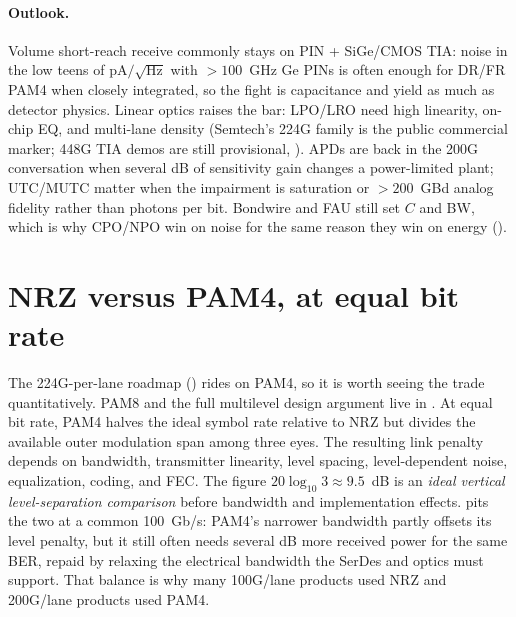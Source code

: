 \paragraph{Outlook.}
Volume short-reach receive commonly stays on PIN + SiGe/CMOS TIA: noise in the
low teens of pA$/\sqrt{\mathrm{Hz}}$ with $>\!100$~GHz Ge PINs is often enough
for DR/FR PAM4 when closely integrated, so the fight is capacitance and yield as
much as detector physics.
Linear optics raises the bar: LPO/LRO need high linearity, on-chip EQ, and
multi-lane density (Semtech's 224G family is the public commercial marker; 448G
TIA demos are still provisional, ). APDs are back in the 200G
conversation when several dB of sensitivity gain changes a power-limited plant;
UTC/MUTC matter when the impairment is saturation or $>\!200$~GBd analog fidelity
rather than photons per bit. Bondwire and FAU still set $C$ and BW, which is why
CPO/NPO win on noise for the same reason they win on energy
().


\section{NRZ versus PAM4, at equal bit rate}
\label{sec:nrzpam4}

The 224G-per-lane roadmap () rides on PAM4, so it is worth seeing
the trade quantitatively. PAM8 and the full multilevel design argument live in
. At equal bit rate, PAM4 halves the ideal symbol rate
relative to NRZ but divides the available outer modulation span among three eyes.
The resulting link penalty depends on bandwidth, transmitter linearity, level
spacing, level-dependent noise, equalization, coding, and FEC. The figure
$20\log_{10}3 \approx 9.5$~dB is an \emph{ideal vertical level-separation
comparison} before bandwidth and implementation effects.  pits the
two at a common 100~Gb/s: PAM4's narrower bandwidth partly offsets its level
penalty, but it still often needs several dB more received power for the same
BER, repaid by relaxing the electrical bandwidth the SerDes and optics must
support. That balance is why many 100G/lane products used NRZ and 200G/lane
products used PAM4.

